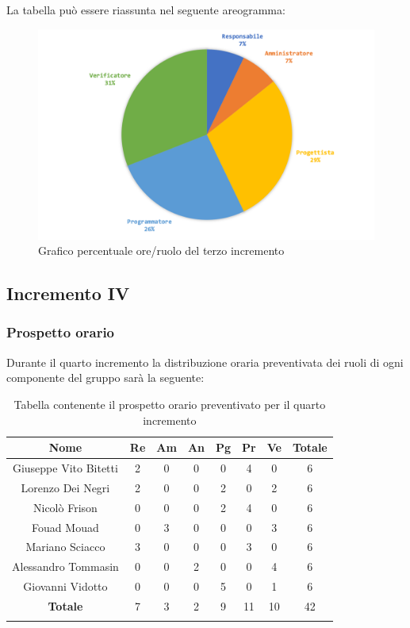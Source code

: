 		La tabella può essere riassunta nel seguente areogramma:
		\begin{figure}[H]
			\centering
			\includegraphics[width=0.8\linewidth]{./images/preventivo/incremento3-2.png}
			\caption{Grafico percentuale ore/ruolo del terzo incremento}
			\label{fig:grafico costi ruolo incremento III}
		\end{figure}
		
		
		
	\subsection{Incremento IV}
		\subsubsection{Prospetto orario}
		Durante il quarto incremento la distribuzione oraria preventivata dei ruoli di ogni componente del gruppo sarà la seguente:
		
		\begin{longtable}{|c|c|c|c|c|c|c|c|}
			\hline
			\rowcolor{lighter-grayer}
			\textbf{Nome} & \textbf{Re} & \textbf{Am} & \textbf{An} & \textbf{Pg}  & \textbf{Pr}   & \textbf{Ve} & \textbf{Totale} \\
			\hline
			\endfirsthead
			
			\hline
			Giuseppe Vito Bitetti 		 & 2 & 0 & 0 & 0 & 4 & 0 & 6\\
			\hline
			\hline
			Lorenzo Dei Negri			 & 2 & 0 & 0 & 2 & 0 & 2 & 6\\
			\hline
			\hline
			Nicolò Frison				    & 0 & 0 & 0 & 2 & 4 & 0 & 6\\
			\hline
			\hline
			Fouad Mouad 				 & 0 & 3 & 0 & 0 & 0 & 3 & 6\\
			\hline
			\hline
			Mariano Sciacco 			 & 3 & 0 & 0 & 0 & 3 & 0 & 6\\
			\hline
			\hline
			Alessandro Tommasin     & 0 & 0 & 2 & 0 & 0 & 4 & 6\\
			\hline
			\hline
			Giovanni Vidotto 			 & 0 & 0 & 0 & 5 & 0 & 1 & 6\\
			\hline 
			\textbf{Totale}			 		& 7 & 3 & 2 & 9 & 11 & 10 & 42\\
			\hline
			\caption{Tabella contenente il prospetto orario preventivato per il quarto incremento}
		\end{longtable}
		\pagebreak
		
